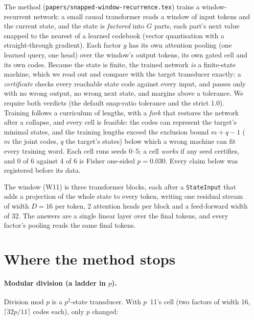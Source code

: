 \documentclass[11pt]{article}
\begin{document}
The method (\texttt{papers/snapped-window-recurrence.tex}) trains a window-recurrent network: a small
causal transformer reads a window of input tokens and the current state, and the state is
\emph{factored} into $G$ parts, each part's next value snapped to the nearest of a learned
codebook (vector quantisation with a straight-through gradient). Each factor $g$ has its own
attention pooling (one learned query, one head) over the window's output tokens, its own gated
cell and its own codes. Because the state is finite, the trained network \emph{is} a finite-state
machine, which we read out and compare with the target transducer exactly: a \emph{certificate}
checks every reachable state code against every input, and passes only with no wrong output, no
wrong next state, and margins above a tolerance. We require both verdicts (the default snap-ratio
tolerance and the strict 1.0). Training follows a curriculum of lengths, with a \emph{fork} that
restores the network after a collapse, and every cell is feasible: the codes can represent the
target's minimal states, and the training lengths exceed the exclusion bound $m + q - 1$ ($m$ the
joint codes, $q$ the target's states) below which a wrong machine can fit every training word.
Each cell runs seeds 0--5; a cell \emph{works} if any seed certifies, and 0 of 6 against 4 of 6
is Fisher one-sided $p = 0.030$. Every claim below was registered before its data.

The window (W11) is three transformer blocks, each after a \texttt{StateInput} that adds a
projection of the whole state to every token, writing one residual stream of width $D = 16$ per
token, 2 attention heads per block and a feed-forward width of 32. The answers are a single linear
layer over the final tokens, and every factor's pooling reads the same final tokens.

\section{Where the method stops}
\label{sec:limits}

\paragraph{Modular division (a ladder in $p$).} Division mod $p$ is a $p^2$-state transducer.
With $p$~11's cell (two factors of width 16, $\lceil 32p/11 \rceil$ codes each), only $p$ changed:
\end{document}
